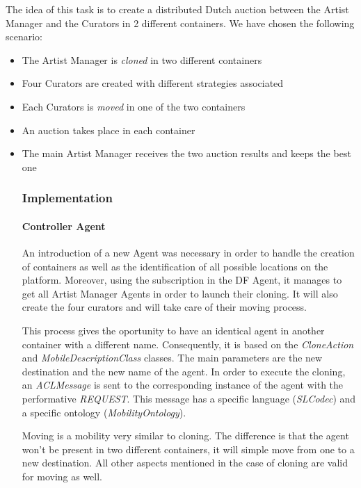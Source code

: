 \documentclass[a4paper,11pt]{article}
\begin{document}
  The idea of this task is to create a distributed Dutch auction between the Artist Manager
  and the Curators in 2 different containers.
  We have chosen the following scenario:
  \begin{itemize}
  \item The Artist Manager is \textit{cloned} in two different containers
  \item Four Curators are created with different strategies associated
  \item Each Curators is \textit{moved} in one of the two containers 
  \item An auction takes place in each container
  \item The main Artist Manager receives the two auction results and keeps the best one

  \subsubsection{Implementation}

  \paragraph{Controller Agent}

  An introduction of a new Agent was necessary in order to handle the creation of containers
  as well as the identification of all possible locations on the platform. Moreover, using the
  subscription in the DF Agent, it manages to get all Artist Manager Agents in order to
  launch their cloning. It will also create the four curators and will take care of their
  moving process.


  This process gives the oportunity to have an identical agent in another container with a different
  name. Consequently, it is based on the \textit{CloneAction} and \textit{MobileDescriptionClass} classes.
  The main parameters are the new destination and the new name of the agent.
  In order to execute the cloning, an \textit{ACLMessage} is sent to the corresponding instance of the agent
  with the performative \textit{REQUEST}. This message has a specific language (\textit{SLCodec}) and a specific
  ontology (\textit{MobilityOntology}).


  Moving is a mobility very similar to cloning. The difference is that the agent won't be present in
  two different containers, it will simple move from one to a new destination. All other aspects mentioned
  in the case of cloning are valid for moving as well.


\end{itemize}
\end{document}
